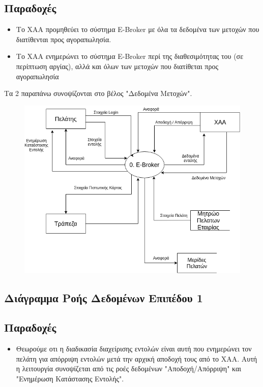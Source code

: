\documentclass{article}
\begin{document}
		\subsection*{Παραδοχές}
		\begin{itemize}
			\item Το ΧΑΑ προμηθεύει το σύστημα E-Broker με όλα τα δεδομένα των μετοχών που διατίθενται προς αγοραπωλησία.
			\item Το ΧΑΑ ενημερώνει το σύστημα E-Broker περί της διαθεσιμότητας του (σε περίπτωση αργίας), αλλά και όλων των μετοχών που διατίθεται προς αγοραπωλησία
		\end{itemize}

		Τα 2 παραπάνω συνοψίζονται στο βέλος "Δεδομένα Μετοχών".

		\begin{figure}[!h]
			\includegraphics[width=\linewidth]{../Structured_Analysis/General_Diagram.png}
		\end{figure}
	
	\newpage
	\subsection{Διάγραμμα Ροής Δεδομένων Επιπέδου 1}
	\subsection*{Παραδοχές}
	\begin{itemize}
		\item Θεωρούμε οτι η διαδικασία διαχείρισης εντολών είναι αυτή που ενημερώνει τον πελάτη για απόρριψη εντολών μετά την αρχική αποδοχή τους από το ΧΑΑ.
		Αυτή η λειτουργία συνοψίζεται από τις ροές δεδομένων "Αποδοχή/Απόρριψη" και "Ενημέρωση Κατάστασης Εντολής".
	\end{itemize}
\end{document}
